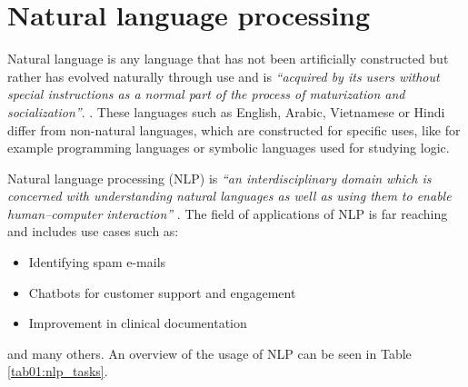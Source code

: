\chapter{Natural language processing}
Natural language is any language that has not been artificially constructed but rather has evolved naturally through use and is  \textit{``acquired by its users without special instructions as a normal part of the process of maturization and socialization''}. \cite[p. 29]{lyons_1991}. These languages such as English, Arabic, Vietnamese or Hindi differ from non-natural languages, which are constructed for specific uses, like for example programming languages or symbolic languages used for studying logic.

Natural language processing (NLP) is \textit{``an interdisciplinary domain which is concerned with understanding natural languages as well as using them to enable human–computer interaction''} \cite[p. 1]{nlp_definition}. The field of applications of NLP is far reaching and includes use cases such as:
\begin{itemize}
\item Identifying spam e-mails \cite{nlp_tasks}
\item Chatbots for customer support and engagement \cite{nlp_uc_b}
\item Improvement in clinical documentation \cite{nlp_uc_h}	
\end{itemize}
and many others. An overview of the usage of NLP can be seen in Table \ref{tab01:nlp_tasks}.

